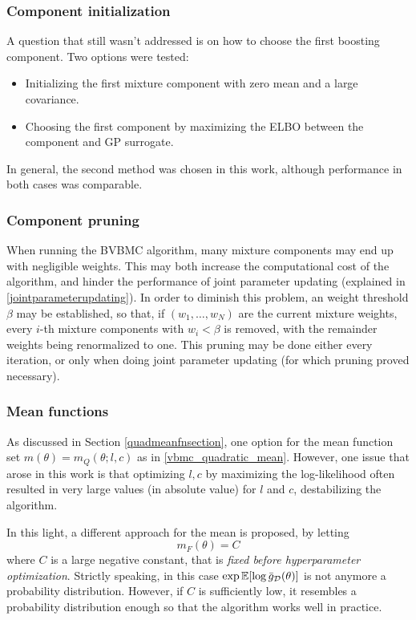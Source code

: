 \subsubsection{Component initialization}
A question that still wasn't addressed is on how to choose the first boosting component. Two options were tested:
\begin{itemize}
	\item Initializing the first mixture component with zero mean and a large covariance.
	\item Choosing the first component by maximizing the ELBO between the component and GP surrogate.
\end{itemize}
In general, the second method was chosen in this work, although performance in both cases was comparable.

\subsubsection{Component pruning}
When running the BVBMC algorithm, many mixture components may end up with negligible weights. This may both increase the computational cost of the algorithm, and hinder the performance of joint parameter updating (explained in \ref{jointparameterupdating}). In order to diminish this problem, an weight threshold $\beta$ may be established, so that, if $(w_1,\ldots,w_N)$ are the current mixture weights, every $i$-th mixture components with $w_i < \beta$ is removed, with the remainder weights being renormalized to one. This pruning may be done either every iteration, or only when doing joint parameter updating (for which pruning proved necessary).

\subsubsection{Mean functions}\label{meansection}
As discussed in Section \ref{quadmeanfnsection}, one option for the mean function set $m(\theta) = m_Q(\theta;l,c)$ as in \eqref{vbmc_quadratic_mean}. However, one issue that arose in this work is that optimizing $l,c$ by maximizing the log-likelihood often resulted in very large values (in absolute value) for $l$ and $c$, destabilizing the algorithm.

In this light, a different approach for the mean is proposed, by letting
\begin{equation}
m_F(\theta) = C
\end{equation}
where $C$ is a large negative constant, that is \textit{fixed before hyperparameter optimization}. Strictly speaking, in this case $\exp {\mathbb E}[\log {\bar{g}}_\mathcal{D}(\theta)]$ is not anymore a probability distribution. However, if $C$ is sufficiently low, it resembles a probability distribution enough so that the algorithm works well in practice.

